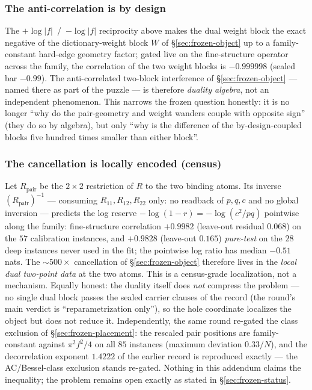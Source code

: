\documentclass[11pt]{article}
\theoremstyle{remark}
\begin{document}
\subsubsection*{The anti-correlation is by design}

The $+\log|f|$~/~$-\log|f|$ reciprocity above makes the dual weight
block the exact negative of the dictionary-weight block $W$ of
\S\ref{sec:frozen-object} up to a family-constant hard-edge
geometry factor; gated live on the fine-structure operator across
the family, the correlation of the two weight blocks is
$-0.999998$ (sealed bar $-0.99$).  The anti-correlated two-block
interference of \S\ref{sec:frozen-object} --- named there as part
of the puzzle --- is therefore \emph{duality algebra}, not an
independent phenomenon.  This narrows the frozen question honestly:
it is no longer ``why do the pair-geometry and weight wanders
couple with opposite sign'' (they do so by algebra), but only ``why
is the difference of the by-design-coupled blocks five hundred
times smaller than either block''.

\subsubsection*{The cancellation is locally encoded (census)}

Let $R_{\mathrm{pair}}$ be the $2\times2$ restriction of $R$ to the
two binding atoms.  Its inverse $(R_{\mathrm{pair}})^{-1}$ ---
consuming $R_{11},R_{12},R_{22}$ only: no readback of $p,q,c$ and
no global inversion --- predicts the log reserve
$-\log(1-r)=-\log(c^{2}/pq)$ pointwise along the family:
fine-structure correlation $+0.9982$ (leave-out residual $0.068$)
on the $57$ calibration instances, and $+0.9828$ (leave-out
$0.165$) \emph{pure-test} on the $28$ deep instances never used in
the fit; the pointwise log ratio has median $-0.51$ nats.  The
$\sim500\times$ cancellation of \S\ref{sec:frozen-object} therefore
lives in the \emph{local dual two-point data} at the two atoms.
This is a census-grade localization, not a mechanism.  Equally
honest: the duality itself does \emph{not} compress the problem ---
no single dual block passes the sealed carrier clauses of the
record (the round's main verdict is ``reparametrization only''),
so the hole coordinate localizes the object but does not reduce
it.  Independently, the same round re-gated the class exclusion of
\S\ref{sec:frozen-placement}: the rescaled pair positions are
family-constant against $\pi^{2}f^{2}/4$ on all $85$ instances
(maximum deviation $0.33/N$), and the decorrelation exponent
$1.4222$ of the earlier record is reproduced exactly --- the
AC/Bessel-class exclusion stands re-gated.  Nothing in this
addendum claims the inequality; the problem remains open exactly as
stated in \S\ref{sec:frozen-status}.
\end{document}
